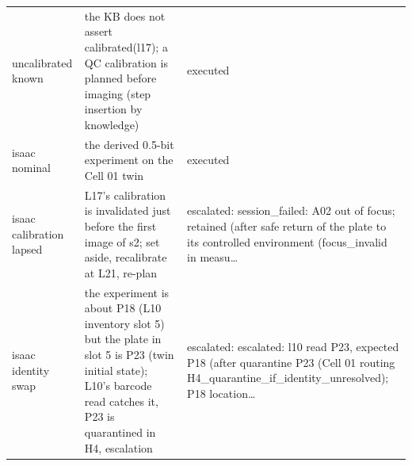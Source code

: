 \documentclass[10pt,a4paper]{article}
\begin{document}
\begin{table}[tbp]
\begin{tabularx}{\linewidth}{lXX}
uncalibrated known & the KB does not assert calibrated(l17); a QC calibration is planned before imaging (step insertion by knowledge) & executed \\
isaac nominal & the derived 0.5-bit experiment on the Cell 01 twin & executed \\
isaac calibration lapsed & L17's calibration is invalidated just before the first image of s2; set aside, recalibrate at L21, re-plan & escalated: session\_\allowbreak{}failed: A02 out of focus; retained (after safe return of the plate to its controlled environment (focus\_\allowbreak{}invalid in measu… \\
isaac identity swap & the experiment is about P18 (L10 inventory slot 5) but the plate in slot 5 is P23 (twin initial state); L10's barcode read catches it, P23 is quarantined in H4, escalation & escalated: escalated: l10 read P23, expected P18 (after quarantine P23 (Cell 01 routing H4\_\allowbreak{}quarantine\_\allowbreak{}if\_\allowbreak{}identity\_\allowbreak{}unresolved); P18 location… \\\bottomrule
\end{tabularx}
\end{table}
\end{document}

